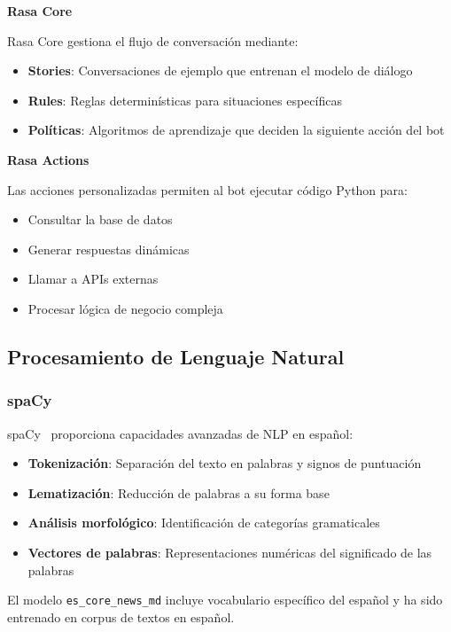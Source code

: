 \textbf{Rasa Core}

Rasa Core gestiona el flujo de conversación mediante:
\begin{itemize}
    \item \textbf{Stories}: Conversaciones de ejemplo que entrenan el modelo de diálogo
    \item \textbf{Rules}: Reglas determinísticas para situaciones específicas
    \item \textbf{Políticas}: Algoritmos de aprendizaje que deciden la siguiente acción del bot
\end{itemize}

\textbf{Rasa Actions}

Las acciones personalizadas permiten al bot ejecutar código Python para:
\begin{itemize}
    \item Consultar la base de datos
    \item Generar respuestas dinámicas
    \item Llamar a APIs externas
    \item Procesar lógica de negocio compleja
\end{itemize}

\subsection{Procesamiento de Lenguaje Natural}

\subsubsection{spaCy}

spaCy~\cite{honnibal2020spacy} proporciona capacidades avanzadas de NLP en español:

\begin{itemize}
    \item \textbf{Tokenización}: Separación del texto en palabras y signos de puntuación
    \item \textbf{Lematización}: Reducción de palabras a su forma base
    \item \textbf{Análisis morfológico}: Identificación de categorías gramaticales
    \item \textbf{Vectores de palabras}: Representaciones numéricas del significado de las palabras
\end{itemize}

El modelo \texttt{es\_core\_news\_md} incluye vocabulario específico del español y ha sido entrenado en corpus de textos en español.


